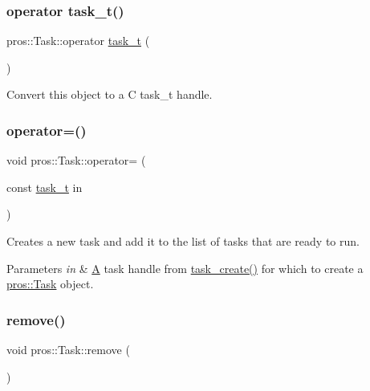 \subsubsection{\texorpdfstring{operator task\_t()}{operator task\_t()}}
{\footnotesize\ttfamily pros\+::\+Task\+::operator \mbox{\hyperlink{rtos_8h_a1d7e0825b8d8876e8cd8ece3f9115293}{task\+\_\+t}} (\begin{DoxyParamCaption}{ }\end{DoxyParamCaption})\hspace{0.3cm}{\ttfamily [inline]}}



Convert this object to a C task\+\_\+t handle. 

\mbox{\label{classpros_1_1Task_aaaeae2788114241e149317248998781e}} 
\subsubsection{\texorpdfstring{operator=()}{operator=()}}
{\footnotesize\ttfamily void pros\+::\+Task\+::operator= (\begin{DoxyParamCaption}\item[{const \mbox{\hyperlink{rtos_8h_a1d7e0825b8d8876e8cd8ece3f9115293}{task\+\_\+t}}}]{in }\end{DoxyParamCaption})}



Creates a new task and add it to the list of tasks that are ready to run. 


\begin{DoxyParams}{Parameters}
{\em in} & \mbox{\hyperlink{structA}{A}} task handle from \mbox{\hyperlink{rtos_8h_a2e3ed8f26b8c1edcff493bc583f0a76a}{task\+\_\+create()}} for which to create a \mbox{\hyperlink{classpros_1_1Task}{pros\+::\+Task}} object. \\
\hline
\end{DoxyParams}
\mbox{\label{classpros_1_1Task_a45269807dfc87bb1d5e9580346793e9d}} 
\subsubsection{\texorpdfstring{remove()}{remove()}}
{\footnotesize\ttfamily void pros\+::\+Task\+::remove (\begin{DoxyParamCaption}{ }\end{DoxyParamCaption})}



